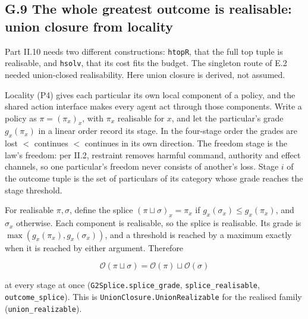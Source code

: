 \documentclass[
]{article}
\begin{document}
\subsection{G.9 The whole greatest outcome is realisable: union closure
from
locality}\label{g.9-the-whole-greatest-outcome-is-realisable-union-closure-from-locality}

Part II.10 needs two different constructions: \texttt{htopR}, that the
full top tuple is realisable, and \texttt{hsolv}, that its cost fits the
budget. The singleton route of E.2 needed union-closed realisability.
Here union closure is derived, not assumed.

Locality (P4) gives each particular its own local component of a policy,
and the shared action interface makes every agent act through those
components. Write a policy as \(\pi=(\pi_x)_x\), with \(\pi_x\)
realisable for \(x\), and let the particular's grade \(g_x(\pi_x)\) in a
linear order record its stage. In the four-stage order the grades are
lost \(<\) continues \(<\) continues in its own direction. The freedom
stage is the law's freedom: per II.2, restraint removes harmful command,
authority and effect channels, so one particular's freedom never
consists of another's loss. Stage \(i\) of the outcome tuple is the set
of particulars of its category whose grade reaches the stage threshold.

For realisable \(\pi,\sigma\), define the splice
\((\pi\sqcup\sigma)_x=\pi_x\) if \(g_x(\sigma_x)\le g_x(\pi_x)\), and
\(\sigma_x\) otherwise. Each component is realisable, so the splice is
realisable. Its grade is \(\max(g_x(\pi_x),g_x(\sigma_x))\), and a
threshold is reached by a maximum exactly when it is reached by either
argument. Therefore

\[
\mathcal O(\pi\sqcup\sigma)=\mathcal O(\pi)\sqcup\mathcal O(\sigma)
\]

at every stage at once
(\texttt{G\allowbreak{}2\allowbreak{}S\allowbreak{}p\allowbreak{}l\allowbreak{}i\allowbreak{}c\allowbreak{}e\allowbreak{}.\allowbreak{}s\allowbreak{}p\allowbreak{}l\allowbreak{}i\allowbreak{}c\allowbreak{}e\allowbreak{}\_\allowbreak{}g\allowbreak{}r\allowbreak{}a\allowbreak{}d\allowbreak{}e},
\texttt{s\allowbreak{}p\allowbreak{}l\allowbreak{}i\allowbreak{}c\allowbreak{}e\allowbreak{}\_\allowbreak{}r\allowbreak{}e\allowbreak{}a\allowbreak{}l\allowbreak{}i\allowbreak{}s\allowbreak{}a\allowbreak{}b\allowbreak{}l\allowbreak{}e},
\texttt{outcome\_splice}). This is
\texttt{U\allowbreak{}n\allowbreak{}i\allowbreak{}o\allowbreak{}n\allowbreak{}C\allowbreak{}l\allowbreak{}o\allowbreak{}s\allowbreak{}u\allowbreak{}r\allowbreak{}e\allowbreak{}.\allowbreak{}U\allowbreak{}n\allowbreak{}i\allowbreak{}o\allowbreak{}n\allowbreak{}R\allowbreak{}e\allowbreak{}a\allowbreak{}l\allowbreak{}i\allowbreak{}z\allowbreak{}a\allowbreak{}b\allowbreak{}l\allowbreak{}e}
for the realised family (\texttt{union\_realizable}).
\end{document}
